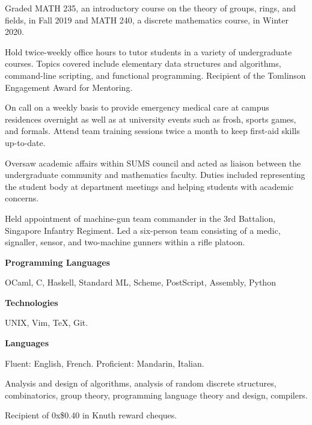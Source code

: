 
\smallskip
Graded MATH 235, an introductory course on the theory of groups, rings, and fields, in Fall 2019
and MATH 240, a discrete mathematics course, in Winter 2020.
\medskip

\smallskip
Hold twice-weekly office hours to tutor students in a variety of undergraduate courses.
Topics covered include elementary data structures and algorithms, command-line scripting,
and functional programming. Recipient of the Tomlinson Engagement Award for Mentoring.
\medskip

\filbreak %

\smallskip
On call on a weekly basis to provide emergency medical care at campus residences overnight as well as at
university events such as frosh, sports games, and formals. Attend team training sessions twice a month to keep
first-aid skills up-to-date.
\medskip

\smallskip
Oversaw academic affairs within SUMS council and acted as liaison between the undergraduate community and
mathematics faculty. Duties included representing the student body at department meetings and helping students with
academic concerns.
\medskip

\smallskip
Held appointment of machine-gun team commander in the 3rd Battalion, Singapore Infantry Regiment.
Led a six-person team consisting of a medic, signaller, sensor, and two-machine gunners within a rifle platoon.
\medskip


{\bf Programming Languages}\par
OCaml, C, Haskell, Standard ML, Scheme, PostScript, Assembly, Python
\medskip

{\bf Technologies}\par
UNIX, Vim, \TeX, Git.
\medskip

{\bf Languages}\par
Fluent: English, French. Proficient: Mandarin, Italian.
\medskip


Analysis and design of algorithms, analysis of random discrete structures, combinatorics, group theory,
programming language theory and design, compilers.


Recipient of 0x\$0.40 in Knuth reward cheques.

\bye

